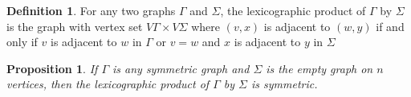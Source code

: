 \documentclass[12pt]{amsart}
\theoremstyle{plain}
\newtheorem{proposition}{Proposition}
\theoremstyle{definition}
\newtheorem{definition}{Definition}
\newtheorem{todo}{To Do}
\theoremstyle{remark}
\DeclareMathOperator{\Aut}{Aut}
\newcommand{\cD}{\mathcal{D}}
\begin{document}
\begin{definition}
For any two graphs $\Gamma$ and $\Sigma$,
the lexicographic product of $\Gamma$ by $\Sigma$
is the graph with vertex set $V \Gamma \times V \Sigma$
where $(v,x)$ is adjacent to $(w,y)$
if and only if $v$ is adjacent to $w$ in $\Gamma$
or $v = w$ and $x$ is adjacent to $y$ in $\Sigma$
\end{definition}

\begin{proposition}
If $\Gamma$ is any symmetric graph and $\Sigma$ is the empty
graph on $n$ vertices, then the lexicographic product
of $\Gamma$ by $\Sigma$ is symmetric.
\end{proposition}


%



\end{document}
